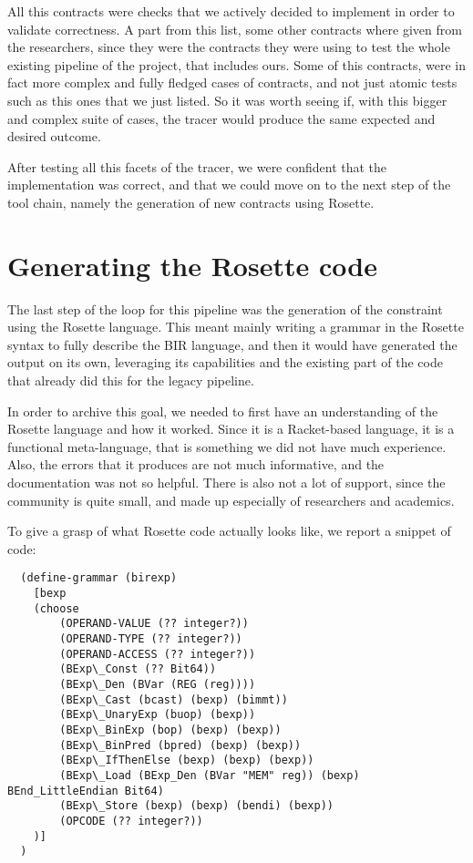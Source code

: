 All this contracts were checks that we actively decided to implement in order to
validate correctness. A part from this list, some other contracts where given from
the researchers, since they were the contracts they were using to test the whole
existing pipeline of the project, that includes ours. Some of this contracts, were
in fact more complex and fully fledged cases of contracts, and not just atomic
tests such as this ones that we just listed. So it was worth seeing if, with
this bigger and complex suite of cases, the tracer would produce the same expected
and desired outcome.

After testing all this facets of the tracer, we were confident that the
implementation was correct, and that we could move on to the next step of the tool
chain, namely the generation of new contracts using Rosette.

\section{Generating the Rosette code}
\label{cha:Generating the Rosette code} The last step of the loop for this
pipeline was the generation of the constraint using the Rosette language. This meant
mainly writing a grammar in the Rosette syntax to fully describe the BIR language,
and then it would have generated the output on its own, leveraging its capabilities
and the existing part of the code that already did this for the legacy pipeline.

In order to archive this goal, we needed to first have an understanding of the
Rosette language and how it worked. Since it is a Racket-based language, it is a
functional meta-language, that is something we did not have much experience.
Also, the errors that it produces are not much informative, and the
documentation was not so helpful. There is also not a lot of support, since the
community is quite small, and made up especially of researchers and academics.

To give a grasp of what Rosette code actually looks like, we report a snippet of
code:

\begin{verbatim}
  (define-grammar (birexp)
    [bexp
    (choose
        (OPERAND-VALUE (?? integer?))
        (OPERAND-TYPE (?? integer?))
        (OPERAND-ACCESS (?? integer?))
        (BExp\_Const (?? Bit64))
        (BExp\_Den (BVar (REG (reg))))
        (BExp\_Cast (bcast) (bexp) (bimmt))
        (BExp\_UnaryExp (buop) (bexp))
        (BExp\_BinExp (bop) (bexp) (bexp))
        (BExp\_BinPred (bpred) (bexp) (bexp))
        (BExp\_IfThenElse (bexp) (bexp) (bexp))
        (BExp\_Load (BExp_Den (BVar "MEM" reg)) (bexp) BEnd_LittleEndian Bit64)
        (BExp\_Store (bexp) (bexp) (bendi) (bexp))
        (OPCODE (?? integer?))
    )]
  )
\end{verbatim}

